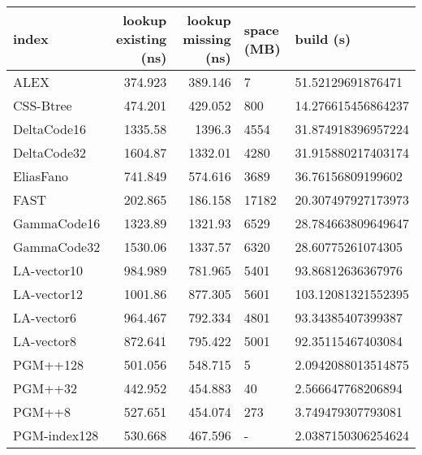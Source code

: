 \begin{tabular}{lrrll}
\hline
 index             &   lookup existing (ns) &   lookup missing (ns) & space (MB)   & build (s)             \\
\hline
 ALEX              &                374.923 &               389.146 & 7            & 51.52129691876471     \\
 CSS-Btree         &                474.201 &               429.052 & 800          & 14.276615456864237    \\
 DeltaCode16       &               1335.58  &              1396.3   & 4554         & 31.874918396957224    \\
 DeltaCode32       &               1604.87  &              1332.01  & 4280         & 31.915880217403174    \\
 EliasFano         &                741.849 &               574.616 & 3689         & 36.76156809199602     \\
 FAST              &                202.865 &               186.158 & 17182        & 20.307497927173973    \\
 GammaCode16       &               1323.89  &              1321.93  & 6529         & 28.784663809649647    \\
 GammaCode32       &               1530.06  &              1337.57  & 6320         & 28.60775261074305     \\
 LA-vector10       &                984.989 &               781.965 & 5401         & 93.86812636367976     \\
 LA-vector12       &               1001.86  &               877.305 & 5601         & 103.12081321552395    \\
 LA-vector6        &                964.467 &               792.334 & 4801         & 93.34385407399387     \\
 LA-vector8        &                872.641 &               795.422 & 5001         & 92.35115467403084     \\
 PGM++128          &                501.056 &               548.715 & 5            & 2.0942088013514875    \\
 PGM++32           &                442.952 &               454.883 & 40           & 2.566647768206894     \\
 PGM++8            &                527.651 &               454.074 & 273          & 3.749479307793081     \\
 PGM-index128      &                530.668 &               467.596 & -            & 2.0387150306254624    \\

\end{tabular}
